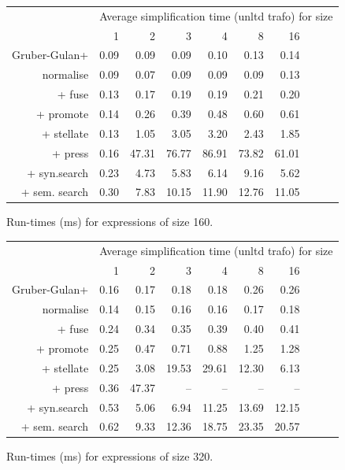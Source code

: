 \begin{figure}\begin{tabular}{rrrrrrrrrr}
 & \multicolumn{9}{c}{Average simplification time (unltd trafo) for size} \\
 & 1 & 2 & 3 & 4 & 8 & 16 \\
Gruber-Gulan+ & 0.09 & 0.09 & 0.09 & 0.10 & 0.13 & 0.14 \\
normalise & 0.09 & 0.07 & 0.09 & 0.09 & 0.09 & 0.13 \\
+ fuse & 0.13 & 0.17 & 0.19 & 0.19 & 0.21 & 0.20 \\
+ promote & 0.14 & 0.26 & 0.39 & 0.48 & 0.60 & 0.61 \\
+ stellate & 0.13 & 1.05 & 3.05 & 3.20 & 2.43 & 1.85 \\
+ press & 0.16 & 47.31 & 76.77 & 86.91 & 73.82 & 61.01 \\
+ syn.search & 0.23 & 4.73 & 5.83 & 6.14 & 9.16 & 5.62 \\
+ sem. search & 0.30 & 7.83 & 10.15 & 11.90 & 12.76 & 11.05 \\
\end{tabular}\caption{Run-times (ms) for expressions of size 160.}\end{figure}
\begin{figure}\begin{tabular}{rrrrrrrrrr}
 & \multicolumn{9}{c}{Average simplification time (unltd trafo) for size} \\
 & 1 & 2 & 3 & 4 & 8 & 16 \\
Gruber-Gulan+ & 0.16 & 0.17 & 0.18 & 0.18 & 0.26 & 0.26 \\
normalise & 0.14 & 0.15 & 0.16 & 0.16 & 0.17 & 0.18 \\
+ fuse & 0.24 & 0.34 & 0.35 & 0.39 & 0.40 & 0.41 \\
+ promote & 0.25 & 0.47 & 0.71 & 0.88 & 1.25 & 1.28 \\
+ stellate & 0.25 & 3.08 & 19.53 & 29.61 & 12.30 & 6.13 \\
+ press & 0.36 & 47.37 & -- & -- & -- & -- \\
+ syn.search & 0.53 & 5.06 & 6.94 & 11.25 & 13.69 & 12.15 \\
+ sem. search & 0.62 & 9.33 & 12.36 & 18.75 & 23.35 & 20.57 \\
\end{tabular}\caption{Run-times (ms) for expressions of size 320.}\end{figure}
